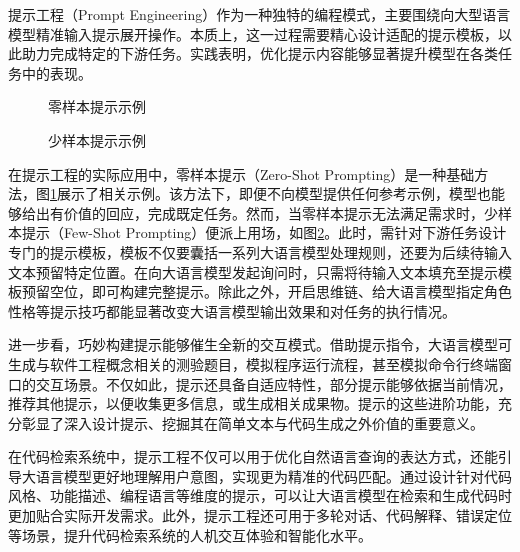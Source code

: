 \documentclass[UTF8,a4paper,12pt]{ctexart}
\numberwithin{equation}{section}
\begin{document}
提示工程（Prompt Engineering）作为一种独特的编程模式，主要围绕向大型语言模型精准输入提示展开操作。本质上，这一过程需要精心设计适配的提示模板，以此助力完成特定的下游任务。实践表明，优化提示内容能够显著提升模型在各类任务中的表现。\par

\begin{figure}[H]
	\caption{零样本提示示例}
	\label{zero_shot}
\end{figure}
\begin{figure}[H]
	\caption{少样本提示示例}
	\label{few_shot}
\end{figure}
在提示工程的实际应用中，零样本提示（Zero-Shot Prompting）\cite{ref17}是一种基础方法，图\ref{zero_shot}展示了相关示例。该方法下，即便不向模型提供任何参考示例，模型也能够给出有价值的回应，完成既定任务。然而，当零样本提示无法满足需求时，少样本提示（Few-Shot Prompting）\cite{ref18}便派上用场，如图\ref{few_shot}。此时，需针对下游任务设计专门的提示模板，模板不仅要囊括一系列大语言模型处理规则，还要为后续待输入文本预留特定位置。在向大语言模型发起询问时，只需将待输入文本填充至提示模板预留空位，即可构建完整提示。除此之外，开启思维链、给大语言模型指定角色性格等提示技巧都能显著改变大语言模型输出效果和对任务的执行情况。\par
进一步看，巧妙构建提示能够催生全新的交互模式。借助提示指令，大语言模型可生成与软件工程概念相关的测验题目，模拟程序运行流程，甚至模拟命令行终端窗口的交互场景。不仅如此，提示还具备自适应特性，部分提示能够依据当前情况，推荐其他提示，以便收集更多信息，或生成相关成果物。提示的这些进阶功能，充分彰显了深入设计提示、挖掘其在简单文本与代码生成之外价值的重要意义。\par
在代码检索系统中，提示工程不仅可以用于优化自然语言查询的表达方式，还能引导大语言模型更好地理解用户意图，实现更为精准的代码匹配。通过设计针对代码风格、功能描述、编程语言等维度的提示，可以让大语言模型在检索和生成代码时更加贴合实际开发需求。此外，提示工程还可用于多轮对话、代码解释、错误定位等场景，提升代码检索系统的人机交互体验和智能化水平。
\end{document}
